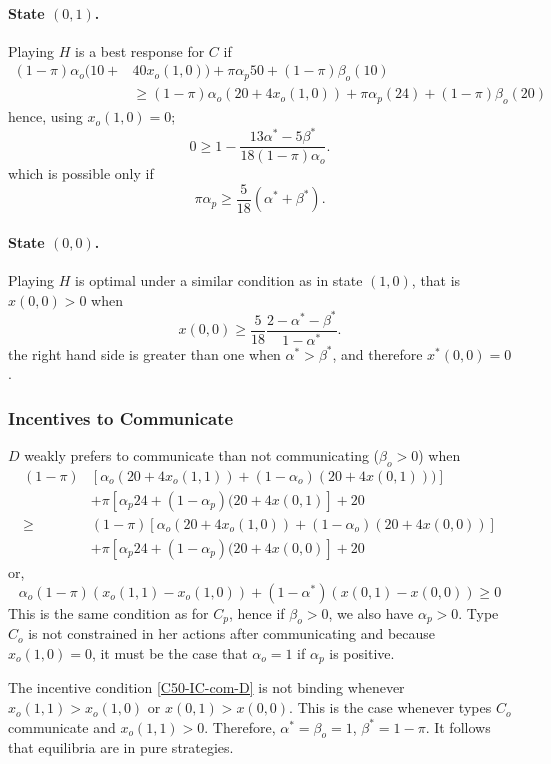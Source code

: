 \documentclass[12pt]{article}
\theoremstyle{break}
\begin{document}
\paragraph{State $(0,1)$.} Playing $H$ is a best response for $C$ if
\[\begin{split}
	(1-\pi)\alpha_o (10+&40 x_o(1,0))+\pi \alpha_p 50+(1-\pi)\beta_o (10)\\
		&\geq (1-\pi)\alpha_o (20+4 x_o(1,0))+\pi \alpha_p(24)+(1-\pi)\beta_o (20)
\end{split}
\]
hence, using $x_o(1,0)=0$;  
\[
	0\geq 1-\frac{13\alpha^*-5\beta^*}{18(1-\pi)\alpha_o}.
\]
which is possible only if 
\begin{equation}\label{cond-c50-01}
	\pi\alpha_p\geq \frac{5}{18}(\alpha^*+\beta^*).
\end{equation}


%
\paragraph{State $(0,0)$.} Playing $H$ is optimal under a similar condition as in state $(1,0)$, that is $x(0,0)>0$ when
\[
x(0,0)\geq \frac{5}{18}\frac{2-\alpha^*-\beta^*}{1-\alpha^*}.
\]
the right hand side is greater than one when $\alpha^*>\beta^*$, and therefore $x^*(0,0)=0$.

\subsubsection*{Incentives to Communicate}
$D$ weakly prefers to communicate than not communicating ($\beta_o>0$) when
\[\begin{split}
(1-\pi)&[\alpha_o(20+4 x_o(1,1))+(1-\alpha_o)(20+4x(0,1)))]\\ 
&+\pi [\alpha_p 24+(1-\alpha_p)(20+4x(0,1)]+20\\ 
	\geq	&(1-\pi)[\alpha_o(20+4 x_o(1,0))+(1-\alpha_o)(20+4x(0,0))]\\ 
	&+\pi [\alpha_p 24+(1-\alpha_p)(20+4x(0,0)]+20
\end{split}
\]
or,
\begin{equation}\label{C50-IC-com-D}
\alpha_o (1-\pi) (x_o(1,1)-x_o(1,0))+(1-\alpha^*)(x(0,1)-x(0,0))\geq 0
\end{equation}
%
This is the same condition as for $C_p$, hence if $\beta_o>0$, we also have $\alpha_p>0$. Type $C_o$ is not constrained in her actions after communicating and because $x_o(1,0)=0$, it must be the case that $\alpha_o=1$ if $\alpha_p$ is positive. 

The incentive condition \eqref{C50-IC-com-D} is not binding whenever 
$x_o(1,1)>x_o(1,0)$ or $x(0,1)>x(0,0)$. This is the case whenever types $C_o$ communicate and $x_o(1,1)>0$. Therefore, $\alpha^*=\beta_o=1$, $\beta^* = 1-\pi$. It follows that equilibria are in pure strategies.
\end{document}
